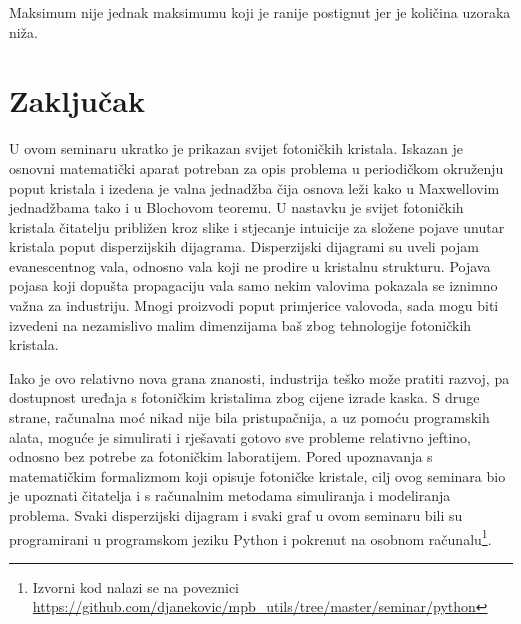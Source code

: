 \documentclass[utf8, seminar, numeric]{fer}
\begin{document}
Maksimum nije jednak maksimumu koji je ranije postignut jer je količina uzoraka
niža.

\chapter{Zaključak}

U ovom seminaru ukratko je prikazan svijet fotoničkih kristala. Iskazan je osnovni
matematički aparat potreban za opis problema u periodičkom okruženju poput
kristala i izedena je valna jednadžba čija osnova leži kako u Maxwellovim
jednadžbama tako i u Blochovom teoremu. U nastavku je svijet fotoničkih kristala
čitatelju približen kroz slike i stjecanje intuicije za složene pojave unutar
kristala poput disperzijskih dijagrama. Disperzijski dijagrami su uveli pojam
evanescentnog vala, odnosno vala koji ne prodire u kristalnu strukturu. Pojava
pojasa koji dopušta propagaciju vala samo nekim valovima pokazala se iznimno
važna za industriju. Mnogi proizvodi poput primjerice valovoda, sada mogu biti
izvedeni na nezamislivo malim dimenzijama baš zbog tehnologije fotoničkih
kristala.

Iako je ovo relativno nova grana znanosti, industrija teško može pratiti
razvoj, pa dostupnost uređaja s fotoničkim kristalima zbog cijene izrade kaska.
S druge strane, računalna moć nikad nije bila pristupačnija, a uz pomoću
programskih alata, moguće je simulirati i rješavati gotovo sve probleme
relativno jeftino, odnosno bez potrebe za fotoničkim laboratijem. Pored
upoznavanja s matematičkim formalizmom koji opisuje fotoničke kristale, cilj ovog
seminara bio je upoznati čitatelja i s računalnim metodama simuliranja i
modeliranja problema. Svaki disperzijski dijagram i svaki graf u ovom seminaru
bili su programirani u programskom jeziku Python i pokrenut na osobnom
računalu\footnote{ Izvorni kod nalazi se na poveznici
\url{https://github.com/djanekovic/mpb_utils/tree/master/seminar/python}}.




\nocite{*}
\end{document}
